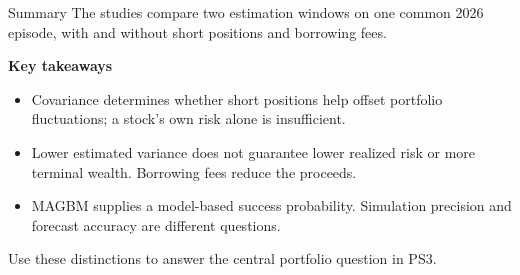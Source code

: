 \documentclass[aspectratio=169,11pt]{beamer}
\begin{document}
\begin{frame}{Summary}
The studies compare two estimation windows on one common 2026 episode,
with and without short positions and borrowing fees.

\vspace{0.6em}
\textbf{Key takeaways}
\begin{itemize}\setlength{\itemsep}{0.55em}
\item Covariance determines whether short positions help offset portfolio
fluctuations; a stock's own risk alone is insufficient.
\item Lower estimated variance does not guarantee lower realized risk or
more terminal wealth. Borrowing fees reduce the proceeds.
\item MAGBM supplies a model-based success probability. Simulation precision
and forecast accuracy are different questions.
\end{itemize}
\vspace{0.6em}
Use these distinctions to answer the central portfolio question in PS3.
\end{frame}
\end{document}
